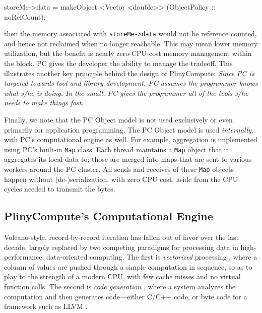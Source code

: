 \begin{code}
storeMe->data = makeObject <Vector <double>> (ObjectPolicy :: noRefCount);
\end{code}


\noindent then the memory associated with \texttt{storeMe->data} would not be reference counted, and hence not reclaimed when no longer reachable.  
This may mean lower memory utilization,
but the benefit is nearly zero-CPU-cost memory management within the block.
PC gives the developer the ability to manage the tradeoff.
This illustrates another key principle behind the design of PlinyCompute: \emph{Since PC is targeted towards tool and library development, PC assumes the programmer
knows what s/he is doing.  In the small, PC gives the programmer all of the tools s/he needs to make things fast}.

Finally, we note that the PC Object model is not used exclusively or even primarily for application programming.  The PC Object model
is used \emph{internally}, with PC's computational engine as well.  For example, aggregation is implemented using PC's built-in \texttt{Map} class.  Each thread maintains
a \texttt{Map} object that it aggregates its local data to; those are merged into maps that are sent to various workers around the PC cluster.  All sends and
receives of these \texttt{Map} objects happen without (de-)serialization, with zero CPU cost, aside from the CPU cycles needed to transmit the bytes.

\subsection{PlinyCompute's Computational Engine}
\label{sec:engine}

Volcano-style, record-by-record iteration \cite{graefe1990encapsulation} has fallen out of favor over the last decade, largely replaced by
two competing paradigms for processing data
in high-performance, data-oriented computing.  The first is \emph{vectorized} processing \cite{abadi2009column, boncz2005monetdb, zukowski2005monetdb, idreos2012monetdb}, where a column of values are pushed
through a simple computation in sequence, so as to play to the strength of a modern CPU, with few cache misses and no virtual
function calls.  The second is \emph{code generation} \cite{neumann2011efficiently, nagel2014code, bress2017generating, klonatos2014building, ahmad2009dbtoaster}, where a system analyzes the computation
and then generates code---either C/C++ code, or byte code for a framework such as LLVM \cite{lattner2004llvm, lattner2002llvm}.

